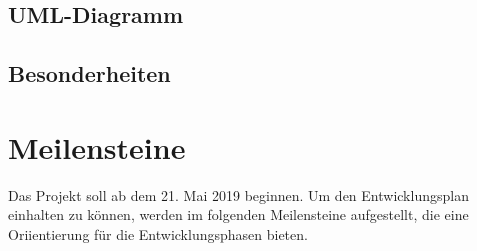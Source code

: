 \documentclass[10pt, a4paper]{report}
\begin{document}
	\subsection{UML-Diagramm}
	\subsection{Besonderheiten}
	\section{Meilensteine}
	Das Projekt soll ab dem 21. Mai 2019 beginnen. Um den Entwicklungsplan einhalten zu können, werden im folgenden Meilensteine aufgestellt, die eine Oriientierung für
	die Entwicklungsphasen bieten. 
	
\end{document}
